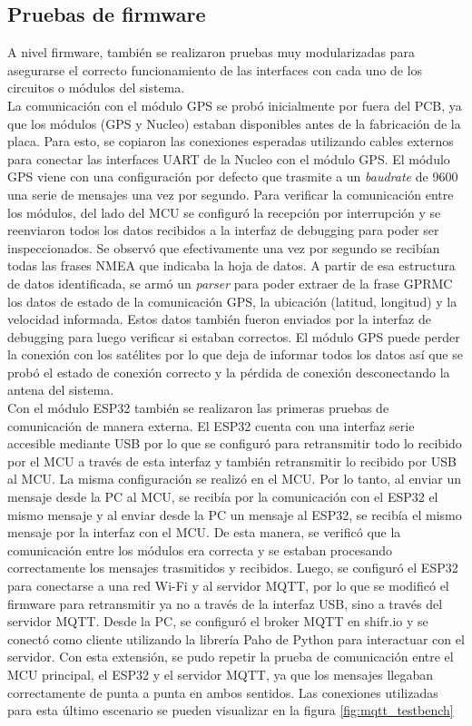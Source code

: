 \subsection{Pruebas de firmware}

A nivel firmware, también se realizaron pruebas muy modularizadas para asegurarse el correcto funcionamiento de las interfaces con cada uno de los circuitos o módulos del sistema. \\ 

La comunicación con el módulo GPS se probó inicialmente por fuera del PCB, ya que los módulos (GPS y Nucleo) estaban disponibles antes de la fabricación de la placa. Para esto, se copiaron las conexiones esperadas utilizando cables externos para conectar las interfaces UART de la Nucleo con el módulo GPS. El módulo GPS viene con una configuración por defecto que trasmite a un \textit{baudrate} de 9600 una serie de mensajes una vez por segundo. Para verificar la comunicación entre los módulos, del lado del MCU se configuró la recepción por interrupción y se reenviaron todos los datos recibidos a la interfaz de debugging para poder ser inspeccionados. Se observó que efectivamente una vez por segundo se recibían todas las frases NMEA que indicaba la hoja de datos. A partir de esa estructura de datos identificada, se armó un \textit{parser} para poder extraer de la frase GPRMC los datos de estado de la comunicación GPS, la ubicación (latitud, longitud) y la velocidad informada. Estos datos también fueron enviados por la interfaz de debugging para luego verificar si estaban correctos. El módulo GPS puede perder la conexión con los satélites por lo que deja de informar todos los datos así que se probó el estado de conexión correcto y la pérdida de conexión desconectando la antena del sistema. \\ 

Con el módulo ESP32 también se realizaron las primeras pruebas de comunicación de manera externa. El ESP32 cuenta con una interfaz serie accesible mediante USB por lo que se configuró para retransmitir todo lo recibido por el MCU a través de esta interfaz y también retransmitir lo recibido por USB al MCU. La misma configuración se realizó en el MCU. Por lo tanto, al enviar un mensaje desde la PC al MCU, se recibía por la comunicación con el ESP32 el mismo mensaje y al enviar desde la PC un mensaje al ESP32, se recibía el mismo mensaje por la interfaz con el MCU. De esta manera, se verificó que la comunicación entre los módulos era correcta y se estaban procesando correctamente los mensajes trasmitidos y recibidos. Luego, se configuró el ESP32 para conectarse a una red Wi-Fi y al servidor MQTT, por lo que se modificó el firmware para retransmitir ya no a través de la interfaz USB, sino a través del servidor MQTT. Desde la PC, se configuró el broker MQTT en shifr.io y se conectó como cliente utilizando la librería Paho \cite{paho} de Python para interactuar con el servidor. Con esta extensión, se pudo repetir la prueba de comunicación entre el MCU principal, el ESP32 y el servidor MQTT, ya que los mensajes llegaban correctamente de punta a punta en ambos sentidos. Las conexiones utilizadas para esta último escenario se pueden visualizar en la figura \ref{fig:mqtt_testbench} 


